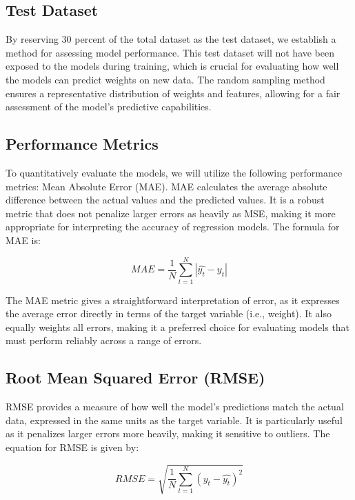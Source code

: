 {\subsection{Test Dataset}
By reserving 30 percent of the total dataset as the test dataset, we establish a method for assessing model performance. This test dataset will not have been exposed to the models during training, which is crucial for evaluating how well the models can predict weights on new data. The random sampling method ensures a representative distribution of weights and features, allowing for a fair assessment of the model's predictive capabilities.

\subsection{Performance Metrics}

To quantitatively evaluate the models, we will utilize the following performance metrics:
Mean Absolute Error (MAE). MAE calculates the average absolute difference between the actual values and the predicted values. It is a robust metric that does not penalize larger errors as heavily as MSE, making it more appropriate for interpreting the accuracy of regression models. The formula for MAE is:

\begin{equation}
	MAE = \frac{1}{N} \sum_{t=1}^{N} \left| \hat{y_t} - y_t \right|
\end{equation}

The MAE metric gives a straightforward interpretation of error, as it expresses the average error directly in terms of the target variable (i.e., weight). It also equally weights all errors, making it a preferred choice for evaluating models that must perform reliably across a range of errors.

\subsection{Root Mean Squared Error (RMSE)}
RMSE provides a measure of how well the model's predictions match the actual data, expressed in the same units as the target variable. It is particularly useful as it penalizes larger errors more heavily, making it sensitive to outliers. The equation for RMSE is given by:

\begin{equation}
	RMSE = \sqrt{\frac{1}{N} \sum_{t=1}^{N} \left( y_t - \hat{y_t} \right)^2}
\end{equation}

}
